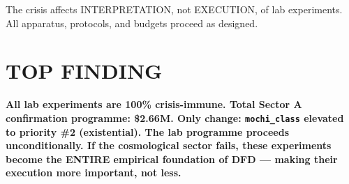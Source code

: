 \documentclass[11pt]{article}
\begin{document}
The crisis affects INTERPRETATION, not EXECUTION, of lab experiments.
All apparatus, protocols, and budgets proceed as designed.

\section*{TOP FINDING}

\begin{tcolorbox}[colback=blue!5!white, colframe=blue!70!black]
\textbf{All lab experiments are 100\% crisis-immune. Total Sector A
confirmation programme: \$2.66M. Only change: \texttt{mochi\_class}
elevated to priority \#2 (existential). The lab programme proceeds
unconditionally. If the cosmological sector fails, these experiments
become the ENTIRE empirical foundation of DFD --- making their execution
more important, not less.}
\end{tcolorbox}
\end{document}
